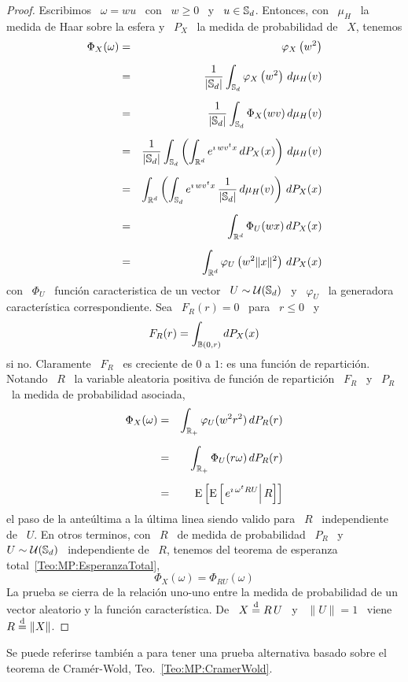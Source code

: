\begin{proof}
  Escribimos \  $\omega = w u$ \  con \ $w \ge  0$ \ y \  $u \in \mathbb{S}_d$.
  Entonces, con  \ $\mu_H$ \ la  medida de Haar sobre  la esfera y \  $P_X$ \ la
  medida de probabilidad de \ $X$, tenemos
  \begin{eqnarray*}
  \Phi_X(\omega) & = & \varphi_X\left( w^2 \right)\\[2mm]
  & = & \frac{1}{|\mathbb{S}_d|} \int_{\mathbb{S}_d} \varphi_X\left( w^2 \right) \, d\mu_H(v)\\[2mm]
  & = & \frac{1}{|\mathbb{S}_d|} \int_{\mathbb{S}_d} \Phi_X(w v) \, d\mu_H(v)\\[2mm]
  & = & \frac{1}{|\mathbb{S}_d|} \int_{\mathbb{S}_d} \left( \int_{\mathbb{R}^d} e^{\imath \,
  w v^t x} \, dP_X(x) \right) \, d\mu_H(v)\\[2mm]
  & = & \int_{\mathbb{R}^d} \left( \int_{\mathbb{S}_d} e^{\imath \, w v^t x} \,
  \frac{1}{|\mathbb{S}_d|} \, d\mu_H(v) \right) \, dP_X(x)\\[2mm]
  & = & \int_{\mathbb{R}^d} \Phi_U(w x) \, dP_X(x)\\[2mm]
  & = & \int_{\mathbb{R}^d} \varphi_U\left( w^2 \|x\|^2 \right) \, dP_X(x)
  \end{eqnarray*}
  con \ $\Phi_U$ \ funci\'on caracteristica  de un vector \ $U \sim \mathcal{U}(\mathbb{S}_d)$
  \ y  \ $\varphi_U$  \ la generadora  caracter\'istica correspondiente.   Sea \
  $F_R(r) = 0$ \ para \ $r \le 0$ \ y
  \[
  F_R(r) = \int_{\mathbb{B}(0,r)} dP_X(x)
  \]
  si no.  Claramente  \ $F_R$ \ es creciente  de $0$ a $1$: es  una funci\'on de
  repartici\'on. Notando \ $R$ \  la variable aleatoria positiva de funci\'on de
  repartici\'on \ $F_R$ \ y \ $P_R$ \ la medida de probabilidad asociada,
  \begin{eqnarray*}
  \Phi_X(\omega) & = & \int_{\mathbb{R}_+} \varphi_U( w^2 r^2) \, dP_R(r)\\[2mm]
  & = & \int_{\mathbb{R}_+} \Phi_U(r \omega) \, dP_R(r)\\[2mm]
  & = & \operatorname{E}\left[ \operatorname{E}\left[ \left. e^{\imath \, \omega^t R U} \right | R \right] \right]
  \end{eqnarray*}
  el paso  de la ante\'ultima  a la  \'ultima linea siendo  valido para \  $R$ \
  independiente  de  \ $U$.   En  otros  terminos, con  \  $R$  \  de medida  de
  probabilidad \  $P_R$ \  y \ $U  \sim \mathcal{U}(\mathbb{S}_d)$  \ independiente de  \ $R$,
  tenemos del teorema de esperanza total~\ref{Teo:MP:EsperanzaTotal},
  \[
  \Phi_X(\omega) = \Phi_{R U}(\omega)
  \]
  La prueba se  cierra de la relaci\'on uno-uno entre  la medida de probabilidad
  de un vector aleatorio y la funci\'on caracter\'istica. De \ $X \stackrel{\mathrm{d}}{=} R \, U$
  \ y \ $\| U \| = 1$ \ viene \ $R \stackrel{\mathrm{d}}{=} \| X \|$.
\end{proof}
%
Se puede referirse tambi\'en a \cite[Prop.~4.10]{BilBre99} para tener una prueba
alternativa      basado     sobre      el     teorema      de     Cram\'er-Wold,
Teo.~\ref{Teo:MP:CramerWold}.

